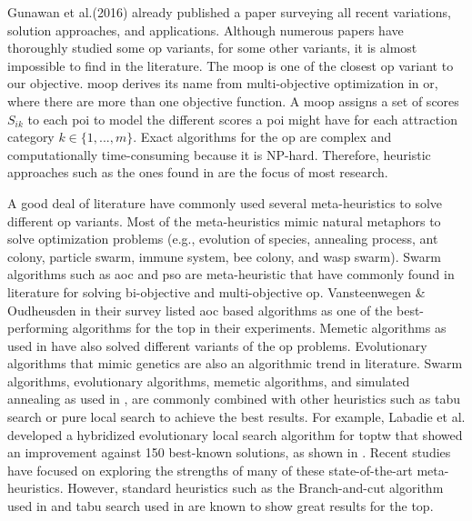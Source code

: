 Gunawan et al.(2016)\parencite{OP_Solution_Gunawan} already published a paper surveying all recent variations, solution approaches, and applications. Although numerous papers have thoroughly studied some \gls{op} variants, for some other variants, it is almost impossible to find in the literature. The \gls{moop} is one of the closest \gls{op} variant to our objective. \Gls{moop} derives its name from multi-objective optimization in \gls{or}, where there are more than one objective function. A \gls{moop} assigns a set of scores $S_{ik}$ to each \gls{poi} to model the different scores a \gls{poi} might have for each attraction category $k \in \{1,...,m\}$. Exact algorithms for the \gls{op} are complex and computationally time-consuming because it is NP-hard\parencite{Golden1987TheProblem}. Therefore, heuristic approaches such as the ones found in \parencite{T.1984HeuristicOrienteering, Golden1987TheProblem, Ramesh1991AnProblem,Souffriau2008AGuides} are the focus of most research. 

A good deal of literature have commonly used several meta-heuristics to solve different \gls{op} variants. Most of the meta-heuristics mimic natural metaphors to solve optimization problems (e.g., evolution of species, annealing process, ant colony, particle swarm, immune system, bee colony, and wasp swarm). Swarm algorithms such as \Gls{aoc} \parencite{Ke2008AntsProblem, Wagner2016StealingProblem, Mukhina2019OrienteeringConstruction, Martin-Moreno2018Multi-ObjectiveProblem} and \gls{pso} \parencite{Sevkli2010StPSO:Optimization, Wagner2016StealingProblem, Schilde2009MetaheuristicsProblem} are meta-heuristic that have commonly found in literature for solving bi-objective and multi-objective \gls{op}. Vansteenwegen \& Oudheusden\parencite{Vansteenwegen2011TheSurvey}  in their survey listed \gls{aoc} based algorithms as one of the best-performing algorithms for the \gls{top} in their experiments. Memetic algorithms as used in \parencite{Lu2018AConstraints,Bouly2010AProblem, Divsalar2014ASelection} have also solved different variants of the \gls{op} problems. Evolutionary algorithms that mimic genetics are also an algorithmic trend in literature\parencite{Wu2018EvolutionaryProblem, Faeda2020AProblem, Kobeaga2018AnProblem}. Swarm algorithms, evolutionary algorithms, memetic algorithms, and simulated annealing as used in \parencite{Pan2018IndependentTourist}, are commonly combined with other heuristics such as tabu search\parencite{Lu2018AConstraints} or pure local search\parencite{Divsalar2014ASelection, Bouly2010AProblem} to achieve the best results. For example, Labadie et al.\parencite{Labadie2011HybridizedWindows} developed a hybridized evolutionary local search algorithm for \gls{toptw} that showed an improvement against 150 best-known solutions, as shown in \parencite{OP_Solution_Gunawan}. Recent studies have focused on exploring the strengths of many of these state-of-the-art meta-heuristics.  However, standard heuristics such as the Branch-and-cut algorithm used in \parencite{Dang2013AProblem} and tabu search used in \parencite{E.2005AProblem} are known to show great results for the \gls{top}. 

